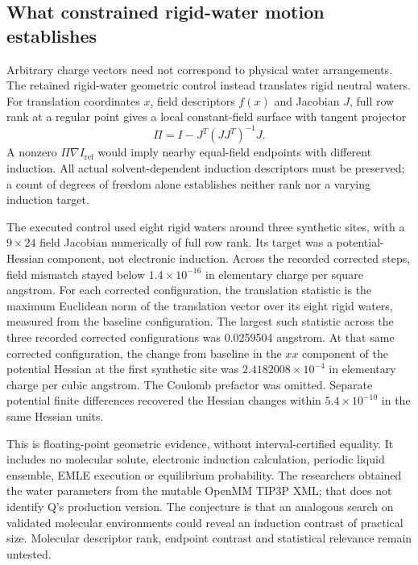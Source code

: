 \documentclass{article}
\begin{document}
\subsection{What constrained rigid-water motion establishes}

Arbitrary charge vectors need not correspond to physical water arrangements. The retained rigid-water geometric control instead translates rigid neutral waters. For translation coordinates $x$, field descriptors $f(x)$ and Jacobian $J$, full row rank at a regular point gives a local constant-field surface with tangent projector
\begin{equation*}
\Pi=I-J^T(JJ^T)^{-1}J.
\end{equation*}
A nonzero $\Pi\nabla I_{\mathrm{ref}}$ would imply nearby equal-field endpoints with different induction. All actual solvent-dependent induction descriptors must be preserved; a count of degrees of freedom alone establishes neither rank nor a varying induction target.

The executed control used eight rigid waters around three synthetic sites, with a $9\times24$ field Jacobian numerically of full row rank. Its target was a potential-Hessian component, not electronic induction. Across the recorded corrected steps, field mismatch stayed below $1.4\times10^{-16}$ in elementary charge per square angstrom. For each corrected configuration, the translation statistic is the maximum Euclidean norm of the translation vector over its eight rigid waters, measured from the baseline configuration. The largest such statistic across the three recorded corrected configurations was 0.0259504 angstrom. At that same corrected configuration, the change from baseline in the $xx$ component of the potential Hessian at the first synthetic site was $2.4182008\times10^{-4}$ in elementary charge per cubic angstrom. The Coulomb prefactor was omitted. Separate potential finite differences recovered the Hessian changes within $5.4\times10^{-10}$ in the same Hessian units.

This is floating-point geometric evidence, without interval-certified equality. It includes no molecular solute, electronic induction calculation, periodic liquid ensemble, EMLE execution or equilibrium probability. The researchers obtained the water parameters from the mutable OpenMM TIP3P XML; that does not identify Q's production version. The conjecture is that an analogous search on validated molecular environments could reveal an induction contrast of practical size. Molecular descriptor rank, endpoint contrast and statistical relevance remain untested.
\end{document}
